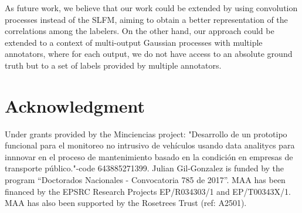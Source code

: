 \documentclass[journal]{IEEEtran}
\begin{document}
As future work, we believe that our work could be extended by using convolution processes \cite{alvarez2011computationally} instead of the SLFM, aiming to obtain a better representation of the correlations among the labelers. On the other hand, our approach could be extended to a context of multi-output Gaussian processes with multiple annotators, where for each output, we do not have access to an absolute ground truth but to a set of labels provided by multiple annotators. 

\section*{Acknowledgment}
Under grants provided by the Minciencias project: "Desarrollo de un prototipo funcional para el monitoreo no intrusivo de veh\'iculos
usando data analitycs para innnovar en el proceso de mantenimiento basado en la condici\'on en empresas de transporte p\'ublico."-code 643885271399. Julian Gil-Gonzalez is funded by the program ``Doctorados Nacionales - Convocatoria 785 de 2017''. MAA has been financed by the EPSRC Research Projects EP/R034303/1 and EP/T00343X/1. MAA has also been supported by the Rosetrees Trust (ref: A2501).
\end{document}
